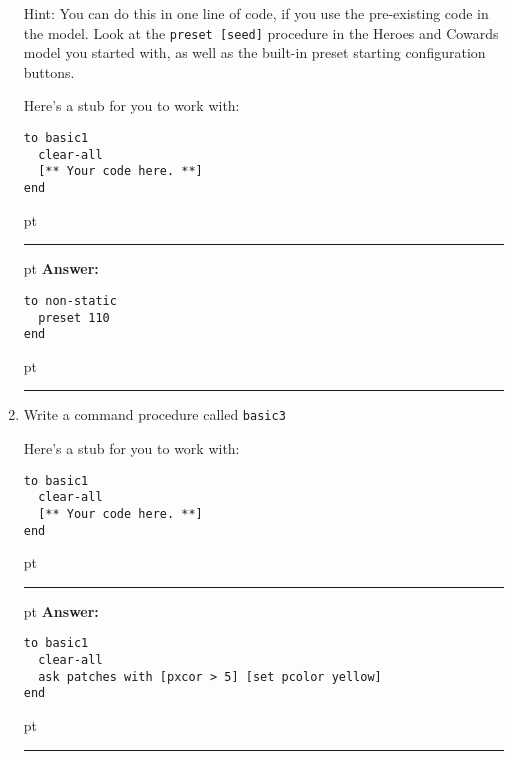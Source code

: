 \documentclass[11pt]{book}
\begin{document}
\begin{enumerate}
Hint: You can do this in one line of code, if you use the pre-existing code in the model. Look at the \texttt{preset [seed]} procedure in the Heroes and Cowards model you started with, as well as the built-in preset starting configuration buttons.

Here's a stub for you to work with:
\begin{verbatim}
to basic1
  clear-all
  [** Your code here. **]
end
\end{verbatim}

\ifnum{}
 pt
\hrule
{} pt
{\bf Answer: }
\begin{verbatim}
to non-static 
  preset 110
end
\end{verbatim}
 pt
\hrule
\fi

\item Write a command procedure called \texttt{basic3} 

Here's a stub for you to work with:
\begin{verbatim}
to basic1
  clear-all
  [** Your code here. **]
end
\end{verbatim}

\ifnum{}
 pt
\hrule
{} pt
{\bf Answer: }
\begin{verbatim}
to basic1
  clear-all
  ask patches with [pxcor > 5] [set pcolor yellow]
end
\end{verbatim}
 pt
\hrule
\fi

\end{enumerate}
\end{document}
